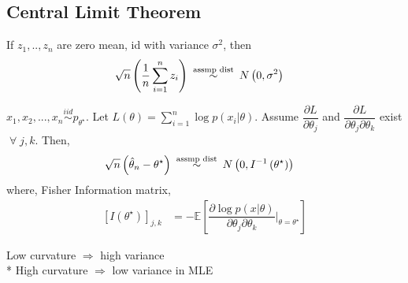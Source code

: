 \documentclass{article}
\begin{document}
\subsection{Central Limit Theorem}
If $z_{1}, .., z_{n}$ are zero mean, id with variance $\sigma^{2}$, then
\begin{align*}
&\sqrt{n}\left(\dfrac{1}{n}  \displaystyle\sum_{i=1}^{n} z_{i}\right) \stackrel{\text{\;assmp dist\;}}{\sim} N\left(0, \sigma^{2}\right)
\end{align*}
\begin{thm} \label{thm:cltc} 
$x_{1}, x_{2}, ..., x_{n} \stackrel{iid}{\sim} p_{\theta^\star }$. Let $L\left(\theta\right)  = \displaystyle\sum_{i=1}^{n} \log p\left(x_{i} | \theta\right)$. Assume $\dfrac{\partial L}{\partial \theta_{j}}$ and $\dfrac{\partial L}{\partial \theta_{j} \partial \theta_{k}}$ exist $\;\forall\; j , k $. Then,
\begin{align*}
&\sqrt{n} \left(\hat{\theta}_{n} - \theta^\star \right) \stackrel{\text{\;assmp dist\;}}{\sim} N\left(0, I^{-1}\left(\theta^\star \right)\right)
\end{align*}
where, Fisher Information matrix,
\begin{align*}
\left[I\left(\theta^\star \right) \right]_{j,k} &= - \mathbb{E}\left[ \dfrac{\partial \log p\left(x | \theta\right)}{\partial \theta_{j} \partial \theta_{k}} \bigg|_{\theta = \theta^\star }\right]
\end{align*}\end{thm}
Low curvature  $\Rightarrow $ high variance
\\* High curvature $\Rightarrow $ low variance in MLE
\end{document}
